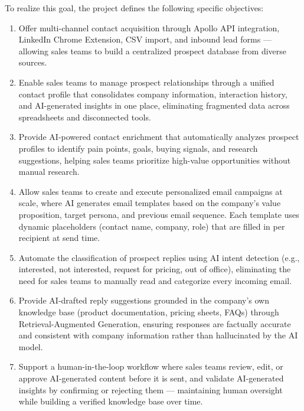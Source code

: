 \documentclass[a4paper]{article}
\begin{document}
To realize this goal, the project defines the following specific 
objectives:

\begin{enumerate}
  \item Offer multi-channel contact acquisition through Apollo API 
  integration, LinkedIn Chrome Extension, CSV import, and inbound 
  lead forms --- allowing sales teams to build a centralized prospect 
  database from diverse sources.

  \item Enable sales teams to manage prospect relationships through 
  a unified contact profile that consolidates company information, 
  interaction history, and AI-generated insights in one place, 
  eliminating fragmented data across spreadsheets and disconnected 
  tools.

  \item Provide AI-powered contact enrichment that automatically 
  analyzes prospect profiles to identify pain points, 
  goals, buying signals, and research suggestions, helping sales 
  teams prioritize high-value opportunities without manual research.

  \item Allow sales teams to create and execute personalized email campaigns at scale, where AI generates email templates based on the company's value proposition, target persona, and previous email sequence. Each template uses dynamic placeholders (contact name, company, role) that are filled in per recipient at send time.

  \item Automate the classification of prospect replies using AI 
  intent detection (e.g., interested, not interested, request for 
  pricing, out of office), eliminating the need for sales teams 
  to manually read and categorize every incoming email.

  \item Provide AI-drafted reply suggestions grounded in the 
  company's own knowledge base (product documentation, pricing 
  sheets, FAQs) through Retrieval-Augmented Generation, ensuring 
  responses are factually accurate and consistent with company 
  information rather than hallucinated by the AI model.

  \item Support a human-in-the-loop workflow where sales teams 
  review, edit, or approve AI-generated content before it is sent, 
  and validate AI-generated insights by confirming or rejecting 
  them --- maintaining human oversight while building a verified 
  knowledge base over time.


\end{enumerate}
\end{document}
